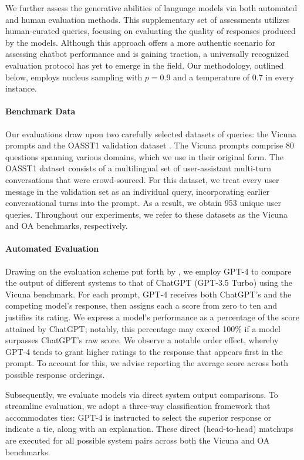 We further assess the generative abilities of language models via both automated and human evaluation methods. This supplementary set of assessments utilizes human-curated queries, focusing on evaluating the quality of responses produced by the models. Although this approach offers a more authentic scenario for assessing chatbot performance and is gaining traction, a universally recognized evaluation protocol has yet to emerge in the field. Our methodology, outlined below, employs nucleus sampling with $p=0.9$ and a temperature of $0.7$ in every instance.

\paragraph{Benchmark Data} Our evaluations draw upon two carefully selected datasets of queries: the Vicuna prompts \citep{vicuna2023} and the OASST1 validation dataset \citep{kopf2023openassistant}. The Vicuna prompts comprise 80 questions spanning various domains, which we use in their original form. The OASST1 dataset consists of a multilingual set of user-assistant multi-turn conversations that were crowd-sourced. For this dataset, we treat every user message in the validation set as an individual query, incorporating earlier conversational turns into the prompt. As a result, we obtain 953 unique user queries. Throughout our experiments, we refer to these datasets as the Vicuna and OA benchmarks, respectively.

\paragraph{Automated Evaluation} Drawing on the evaluation scheme put forth by \citet{vicuna2023}, we employ GPT-4 to compare the output of different systems to that of ChatGPT (GPT-3.5 Turbo) using the Vicuna benchmark. For each prompt, GPT-4 receives both ChatGPT's and the competing model’s response, then assigns each a score from zero to ten and justifies its rating. We express a model’s performance as a percentage of the score attained by ChatGPT; notably, this percentage may exceed 100\% if a model surpasses ChatGPT's raw score. We observe a notable order effect, whereby GPT-4 tends to grant higher ratings to the response that appears first in the prompt. To account for this, we advise reporting the average score across both possible response orderings.

Subsequently, we evaluate models via direct system output comparisons. To streamline evaluation, we adopt a three-way classification framework that accommodates ties: GPT-4 is instructed to select the superior response or indicate a tie, along with an explanation. These direct (head-to-head) matchups are executed for all possible system pairs across both the Vicuna and OA benchmarks.

